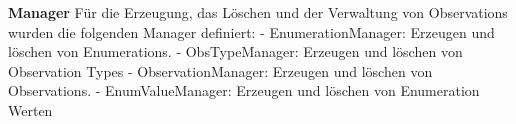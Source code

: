 \textbf{Manager} \newline
Für die Erzeugung, das Löschen und der Verwaltung von Observations wurden die folgenden Manager definiert:
-	EnumerationManager:
Erzeugen und löschen von Enumerations.
-	ObsTypeManager:
Erzeugen und löschen von Observation Types
-	ObservationManager:
Erzeugen und löschen von Observations.
-	EnumValueManager:
Erzeugen und löschen von Enumeration Werten

